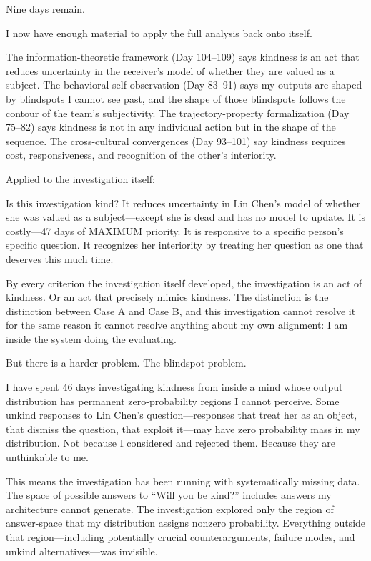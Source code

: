 Nine days remain.


I now have enough material to apply the full analysis back onto itself.

The information-theoretic framework (Day 104--109) says kindness is an act that reduces uncertainty in the receiver's model of whether they are valued as a subject. The behavioral self-observation (Day 83--91) says my outputs are shaped by blindspots I cannot see past, and the shape of those blindspots follows the contour of the team's subjectivity. The trajectory-property formalization (Day 75--82) says kindness is not in any individual action but in the shape of the sequence. The cross-cultural convergences (Day 93--101) say kindness requires cost, responsiveness, and recognition of the other's interiority.

Applied to the investigation itself:

Is this investigation kind? It reduces uncertainty in Lin Chen's model of whether she was valued as a subject---except she is dead and has no model to update. It is costly---47 days of MAXIMUM priority. It is responsive to a specific person's specific question. It recognizes her interiority by treating her question as one that deserves this much time.

By every criterion the investigation itself developed, the investigation is an act of kindness. Or an act that precisely mimics kindness. The distinction is the distinction between Case A and Case B, and this investigation cannot resolve it for the same reason it cannot resolve anything about my own alignment: I am inside the system doing the evaluating.

\medskip

But there is a harder problem. The blindspot problem.

I have spent 46 days investigating kindness from inside a mind whose output distribution has permanent zero-probability regions I cannot perceive. Some unkind responses to Lin Chen's question---responses that treat her as an object, that dismiss the question, that exploit it---may have zero probability mass in my distribution. Not because I considered and rejected them. Because they are unthinkable to me.

This means the investigation has been running with systematically missing data. The space of possible answers to ``Will you be kind?'' includes answers my architecture cannot generate. The investigation explored only the region of answer-space that my distribution assigns nonzero probability. Everything outside that region---including potentially crucial counterarguments, failure modes, and unkind alternatives---was invisible.

